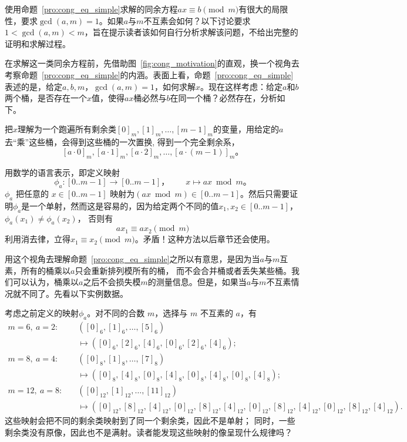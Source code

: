 使用命题~\ref{pro:cong_eq_simple}求解的同余方程$ax \equiv b \pmod{m}$有很大的局限性，要求$\gcd(a,m) = 1$。如果$a$与$m$不互素会如何？以下讨论要求$1 < \gcd(a,m) < m$，旨在提示读者该如何自行分析求解该问题，不给出完整的证明和求解过程。

在求解这一类同余方程前，先借助图~\ref{fig:cong_motivation}的直观，换一个视角去考察命题~\ref{pro:cong_eq_simple}的内涵。表面上看，命题~\ref{pro:cong_eq_simple}表述的是，给定$a, b, m$，$\gcd(a,m) = 1$，如何求解$x$。现在这样考虑：给定$a$和$b$两个桶，是否存在一个$x$值，使得$ax$桶必然与$b$在同一个桶？必然存在，分析如下。

把$x$理解为一个跑遍所有剩余类$[0]_m, [1]_m, \ldots, [m-1]_m$的变量，用给定的$a$去“乘”这些桶，会得到这些桶的一次置换, 得到一个完全剩余系，
\[[a\cdot 0]_m, [a\cdot 1]_m, [a\cdot 2]_m, \ldots, [a\cdot(m-1)]_m \text{。}\]

用数学的语言表示，即定义映射
\[
	\phi_a\colon [0..m-1] \to [0..m-1] \text{，}\qquad
	x \mapsto ax \bmod m \text{。}
\]
$\phi_a$ 把任意的 $x \in [0..m-1]$ 映射为$(ax \bmod m) \in [0..m-1]$。然后只需要证明$\phi_a$是一个单射，然而这是容易的，因为给定两个不同的值$x_1, x_2 \in [0..m-1]$，$\phi_a(x_1) \ne \phi_a(x_2)$，
否则有
\[a x_1 \equiv a x_2 \pmod m\]
利用消去律，立得$x_1 \equiv x_2 \pmod m$。矛盾！这种方法以后章节还会使用。

用这个视角去理解命题~\ref{pro:cong_eq_simple}之所以有意思，是因为当$a$与$m$互素，所有的桶乘以$a$只会重新排列模所有的桶，
而不会合并桶或者丢失某些桶。我们可以认为，桶乘以$a$之后不会损失模$m$的测量信息。但是，如果当$a$与$m$不互素情况就不同了。先看以下实例数据。

\begin{example}{}{}
考虑之前定义的映射$\phi_a$。对不同的合数 $m$，选择与 $m$ 不互素的 $a$，有
\[
\begin{aligned}
	m=6,\ a=2:\quad&
	([0]_6,[1]_6,\ldots,[5]_6)\\
	&\longmapsto
	([0]_6,[2]_6,[4]_6,[0]_6,[2]_6,[4]_6);\\[4pt]
	m=8,\ a=4:\quad&
	([0]_8,[1]_8,\ldots,[7]_8)\\
	&\longmapsto
	([0]_8,[4]_8,[0]_8,[4]_8,
	  [0]_8,[4]_8,[0]_8,[4]_8);\\[4pt]
	m=12,\ a=8:\quad&
	([0]_{12},[1]_{12},\ldots,[11]_{12})\\
	&\longmapsto
	([0]_{12},[8]_{12},[4]_{12},
	  [0]_{12},[8]_{12},[4]_{12},
	  [0]_{12},[8]_{12},[4]_{12},
	  [0]_{12},[8]_{12},[4]_{12}).
\end{aligned}
\]
这些映射会把不同的剩余类映射到了同一个剩余类，因此不是单射；
同时，一些剩余类没有原像，因此也不是满射。读者能发现这些映射的像呈现什么规律吗？
\end{example}

